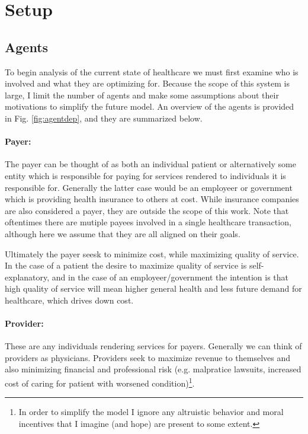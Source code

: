 \documentclass{article}
\begin{document}
\section{Setup}

\subsection{Agents}
To begin analysis of the current state of healthcare we must first examine who is involved and what they are optimizing for. Because the scope of this system is large, I limit the number of agents and make some assumptions about their motivations to simplify the future model. An overview of the agents is provided in Fig. \ref{fig:agentdep}, and they are summarized below.

\paragraph{Payer:}The payer can be thought of as both an individual patient or alternatively some entity which is responsible for paying for services rendered to individuals it is responsible for. Generally the latter case would be an employeer or government which is providing health insurance to others at cost. While insurance companies are also considered a payer, they are outside the scope of this work. Note that oftentimes there are mutiple payees involved in a single healthcare transaction, although here we assume that they are all aligned on their goals.

Ultimately the payer seesk to minimize cost, while maximizing quality of service. In the case of a patient the desire to maximize quality of service is self-explanatory, and in the case of an employeer/government the intention is that high quality of service will mean higher general health and less future demand for healthcare, which drives down cost.

\paragraph{Provider:}These are any individuals rendering services for payers. Generally we can think of providers as physicians. Providers seek to maximize revenue to themselves and also minimizing financial and professional risk (e.g. malpratice lawsuits, increased cost of caring for patient with worsened condition)\footnote{In order to simplify the model I ignore any altruistic behavior and moral incentives that I imagine (and hope) are present to some extent.}.
\end{document}
